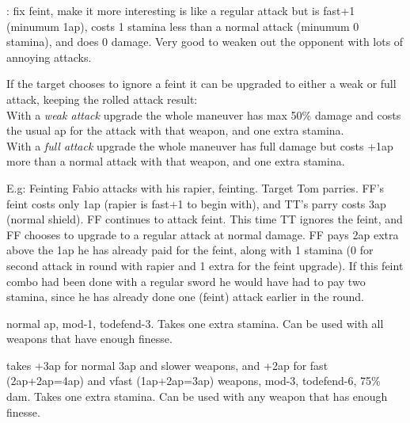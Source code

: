 \todo: fix feint, make it more interesting
 is like a regular attack but is fast+1 (minumum 1ap), costs 1 stamina less than a normal attack (minumum 0 stamina), and does 0 damage. Very good to weaken out the opponent with lots of annoying attacks.

If the target chooses to ignore a feint it can be upgraded to either a weak or full attack, keeping the rolled attack result:\\
With a \emph{weak attack} upgrade the whole maneuver has max 50\% damage and costs the usual ap for the attack with that weapon, and one extra stamina.\\
With a \emph{full attack} upgrade the whole maneuver has full damage but costs +1ap more than a normal attack with that weapon, and one extra stamina.

E.g: Feinting Fabio attacks with his rapier, feinting. Target Tom parries. FF's feint costs only 1ap (rapier is fast+1 to begin with), and TT's parry costs 3ap (normal shield). FF continues to attack feint. This time TT ignores the feint, and FF chooses to upgrade to a regular attack at normal damage. FF pays 2ap extra above the 1ap he has already paid for the feint, along with 1 stamina (0 for second attack in round with rapier and 1 extra for the feint upgrade). If this feint combo had been done with a regular sword he would have had to pay two stamina, since he has already done one (feint) attack earlier in the round.



 normal ap, mod-1, todefend-3. Takes one extra stamina. Can be used with all weapons that have enough finesse.


 takes +3ap for normal 3ap and slower weapons, and +2ap for fast (2ap+2ap=4ap) and vfast (1ap+2ap=3ap) weapons, mod-3, todefend-6, 75\% dam. Takes one extra stamina. Can be used with any weapon that has enough finesse.


